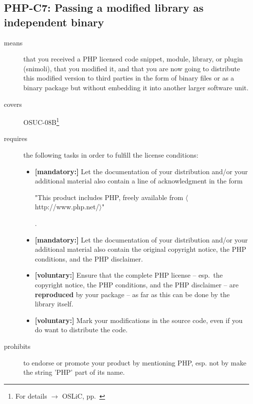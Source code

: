 \subsection{PHP-C7: Passing a modified library as independent binary}
\label{OSUC-08B-PHP}

\begin{description}

\item[means] that you received a PHP licensed code snippet, module, library,
  or plugin (snimoli), that you modified it, and that you are now going to
  distribute this modified version to third parties in the form of binary files
  or as a binary package but without embedding it into another larger software
  unit.

\item[covers] OSUC-08B\footnote{For details $\rightarrow$ OSLiC, pp.\
\pageref{OSUC-08B-DEF}}

\item[requires] the following tasks in order to fulfill the license conditions:
\begin{itemize}
  
  \item \textbf{[mandatory:]} Let the documentation of your distribution and/or
  your additional material also contain a line of acknowledgment in the form
  \begin{footnotesize}"This product includes PHP, freely available from
  $\langle$http://www.php.net/$\rangle$"\end{footnotesize}.
    
  \item \textbf{[mandatory:]} Let the documentation of your distribution and/or
  your additional material also contain the original copyright notice, the PHP
  conditions, and the PHP disclaimer.

  \item \textbf{[voluntary:]} Ensure that the complete PHP license -- esp.\ the
  copyright notice, the PHP conditions, and the PHP disclaimer -- are
  \textbf{reproduced} by your package -- as far as this can be done by the
  library itself.
  
  \item \textbf{[voluntary:]} Mark your modifications in the source code,
  even if you do want to distribute the code.

\end{itemize}

\item[prohibits] to endorse or promote your product by mentioning PHP, esp. not
by make the string 'PHP' part of its name.

\end{description}

